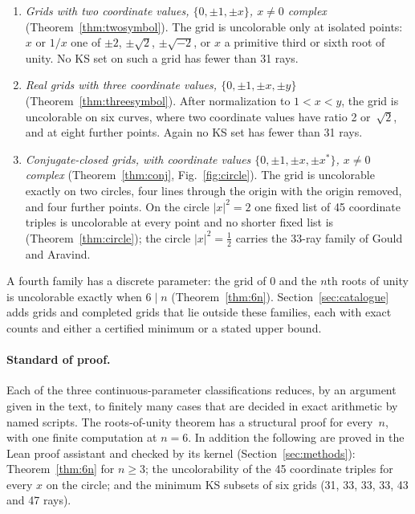 \begin{enumerate}[label=(\roman*)]
\item \emph{Grids with two coordinate values, $\{0,\pm1,\pm x\}$, $x\ne0$ complex}
(Theorem~\ref{thm:twosymbol}).
The grid is uncolorable only at isolated points: $x$ or $1/x$ one of $\pm2$, $\pm\sqrt2$,
$\pm\sqrt{-2}$, or $x$ a primitive third or sixth root of unity.  No KS set on such a grid has
fewer than 31 rays.
\item \emph{Real grids with three coordinate values, $\{0,\pm1,\pm x,\pm y\}$}
(Theorem~\ref{thm:threesymbol}).
After normalization to $1<x<y$, the grid is uncolorable on six curves, where two coordinate
values have ratio 2 or~$\sqrt2$, and at eight further points.  Again no KS set has fewer than
31 rays.
\item \emph{Conjugate-closed grids, with coordinate values $\{0,\pm1,\pm x,\pm x^{*}\}$, $x\ne0$ complex}
(Theorem~\ref{thm:conj}, Fig.~\ref{fig:circle}).  The grid is uncolorable exactly on two
circles, four lines through the origin with the origin removed, and four further points.  On
the circle $|x|^2=2$ one fixed list of 45 coordinate triples is uncolorable at every point and no shorter
fixed list is
(Theorem~\ref{thm:circle}); the circle $|x|^2=\tfrac12$ carries the 33-ray family of Gould and
Aravind.
\end{enumerate}

A fourth family has a discrete parameter: the grid of $0$ and the $n$th roots of unity is
uncolorable exactly when $6\mid n$ (Theorem~\ref{thm:6n}).  Section~\ref{sec:catalogue} adds
grids and completed grids that lie outside these families, each with exact counts and either a certified minimum or
a stated upper bound.

\paragraph{Standard of proof.}
Each of the three continuous-parameter classifications reduces, by an argument given in the
text, to finitely many cases that are decided in exact arithmetic by named scripts.  The
roots-of-unity theorem has a structural proof for every~$n$, with one finite computation at
$n=6$.  In addition the following are proved in the Lean
proof assistant and checked by its kernel (Section~\ref{sec:methods}): Theorem~\ref{thm:6n} for
$n\ge3$; the uncolorability of the 45 coordinate triples for every $x$ on the circle; and the minimum
KS subsets of six grids (31, 33, 33, 33, 43 and 47 rays).

